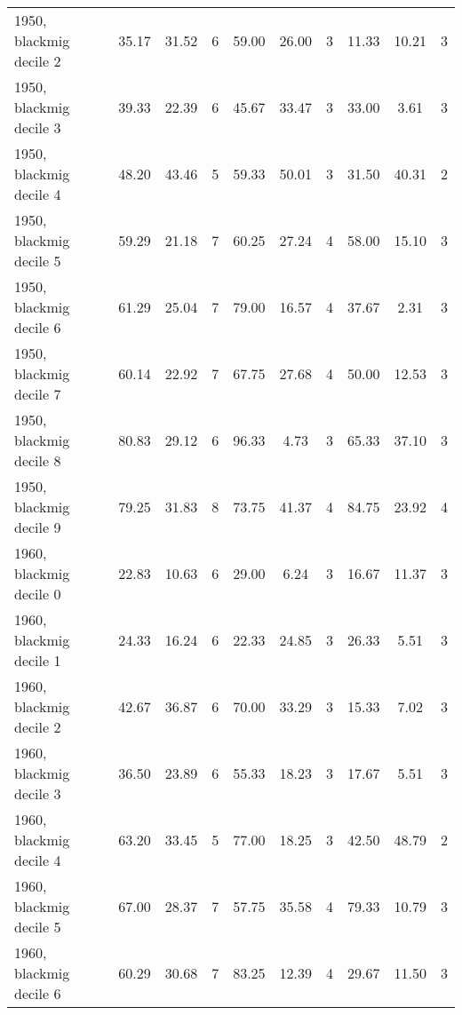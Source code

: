 \begin{table}[htbp]
\begin{tabular}{l*{3}{ccc}}
1950, blackmig decile 2&       35.17&       31.52&           6&       59.00&       26.00&           3&       11.33&       10.21&           3\\
1950, blackmig decile 3&       39.33&       22.39&           6&       45.67&       33.47&           3&       33.00&        3.61&           3\\
1950, blackmig decile 4&       48.20&       43.46&           5&       59.33&       50.01&           3&       31.50&       40.31&           2\\
1950, blackmig decile 5&       59.29&       21.18&           7&       60.25&       27.24&           4&       58.00&       15.10&           3\\
1950, blackmig decile 6&       61.29&       25.04&           7&       79.00&       16.57&           4&       37.67&        2.31&           3\\
1950, blackmig decile 7&       60.14&       22.92&           7&       67.75&       27.68&           4&       50.00&       12.53&           3\\
1950, blackmig decile 8&       80.83&       29.12&           6&       96.33&        4.73&           3&       65.33&       37.10&           3\\
1950, blackmig decile 9&       79.25&       31.83&           8&       73.75&       41.37&           4&       84.75&       23.92&           4\\
1960, blackmig decile 0&       22.83&       10.63&           6&       29.00&        6.24&           3&       16.67&       11.37&           3\\
1960, blackmig decile 1&       24.33&       16.24&           6&       22.33&       24.85&           3&       26.33&        5.51&           3\\
1960, blackmig decile 2&       42.67&       36.87&           6&       70.00&       33.29&           3&       15.33&        7.02&           3\\
1960, blackmig decile 3&       36.50&       23.89&           6&       55.33&       18.23&           3&       17.67&        5.51&           3\\
1960, blackmig decile 4&       63.20&       33.45&           5&       77.00&       18.25&           3&       42.50&       48.79&           2\\
1960, blackmig decile 5&       67.00&       28.37&           7&       57.75&       35.58&           4&       79.33&       10.79&           3\\
1960, blackmig decile 6&       60.29&       30.68&           7&       83.25&       12.39&           4&       29.67&       11.50&           3\\

\end{tabular}
\end{table}
